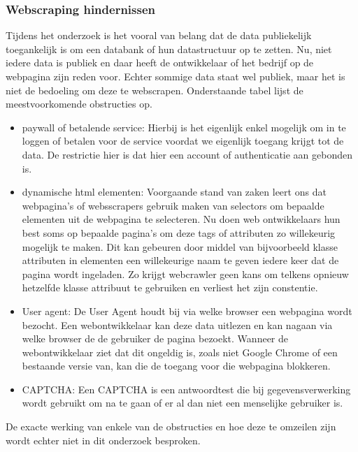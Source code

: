 \subsubsection{Webscraping hindernissen}
Tijdens het onderzoek is het vooral van belang dat de data publiekelijk toegankelijk is om een databank of hun datastructuur op te zetten. Nu, niet iedere data is publiek en daar heeft de ontwikkelaar of het bedrijf op de webpagina zijn reden voor. Echter sommige data staat wel publiek, maar het is niet de bedoeling om deze te webscrapen. 
Onderstaande tabel lijst de meestvoorkomende obstructies op.
\begin{itemize}
	\item paywall of betalende service: 
	Hierbij is het eigenlijk enkel mogelijk om in te loggen of betalen voor de service voordat we eigenlijk toegang krijgt tot de data. De restrictie hier is dat hier een account of authenticatie aan gebonden is.
	\item dynamische html elementen:
	Voorgaande stand van zaken leert ons dat webpagina's of websscrapers gebruik maken van selectors om bepaalde elementen uit de webpagina te selecteren. 
	Nu doen web ontwikkelaars hun best soms op bepaalde pagina's om deze tags of attributen zo willekeurig mogelijk te maken. 
	Dit kan gebeuren door middel van bijvoorbeeld klasse attributen in elementen een willekeurige naam te geven iedere keer dat de pagina wordt ingeladen. 
	Zo krijgt webcrawler geen kans om telkens opnieuw hetzelfde klasse attribuut te gebruiken en verliest het zijn constentie.
	\item User agent:
	De User Agent houdt bij via welke browser een webpagina wordt bezocht.
	Een webontwikkelaar kan deze data uitlezen en kan nagaan via welke browser de de gebruiker de pagina bezoekt.
	Wanneer de webontwikkelaar ziet dat dit ongeldig is, zoals niet Google Chrome of een bestaande versie van, kan die de toegang voor die webpagina blokkeren.
	\item CAPTCHA:
	Een CAPTCHA is een antwoordtest die bij gegevensverwerking wordt gebruikt om na te gaan of er al dan niet een menselijke gebruiker is.
\end{itemize}
De exacte werking van enkele van de obstructies en hoe deze te omzeilen zijn wordt echter niet in dit onderzoek besproken.

